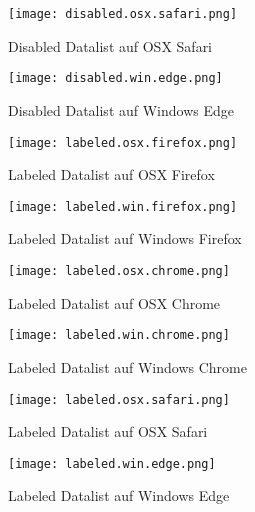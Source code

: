 \begin{figure}[!htb]
    \centering
    \begin{minipage}[b]{0.45\textwidth}
        \centering
        \texttt{[image: disabled.osx.safari.png]}
        \caption{Disabled Datalist auf OSX Safari}
        \label{img:disabledOsxSafariDatalist}
    \end{minipage}
    \hfill
    \begin{minipage}[b]{0.45\textwidth}
        \centering
        \texttt{[image: disabled.win.edge.png]}
        \caption{Disabled Datalist auf Windows Edge}
        \label{img:disabledWinEdgeDatalist}
    \end{minipage}
\end{figure}


\begin{figure}[!htb]
    \centering
    \begin{minipage}[b]{0.45\textwidth}
        \centering
        \texttt{[image: labeled.osx.firefox.png]}
        \caption{Labeled Datalist auf OSX Firefox}
        \label{img:labeledOsxFirefoxDatalist}
    \end{minipage}
    \hfill
    \begin{minipage}[b]{0.45\textwidth}
        \centering
        \texttt{[image: labeled.win.firefox.png]}
        \caption{Labeled Datalist auf Windows Firefox}
        \label{img:labeledWinFirefoxDatalist}
    \end{minipage}
\end{figure}

\begin{figure}[!htb]
    \centering
    \begin{minipage}[b]{0.45\textwidth}
        \centering
        \texttt{[image: labeled.osx.chrome.png]}
        \caption{Labeled Datalist auf OSX Chrome}
        \label{img:labeledOsxChromeDatalist}
    \end{minipage}
    \hfill
    \begin{minipage}[b]{0.45\textwidth}
        \centering
        \texttt{[image: labeled.win.chrome.png]}
        \caption{Labeled Datalist auf Windows Chrome}
        \label{img:labeledWinChromeDatalist}
    \end{minipage}
\end{figure}

\begin{figure}[!htb]
    \centering
    \begin{minipage}[b]{0.45\textwidth}
        \centering
        \texttt{[image: labeled.osx.safari.png]}
        \caption{Labeled Datalist auf OSX Safari}
        \label{img:labeledOsxSafariDatalist}
    \end{minipage}
    \hfill
    \begin{minipage}[b]{0.45\textwidth}
        \centering
        \texttt{[image: labeled.win.edge.png]}
        \caption{Labeled Datalist auf Windows Edge}
        \label{img:labeledWinEdgeDatalist}
    \end{minipage}
\end{figure}

